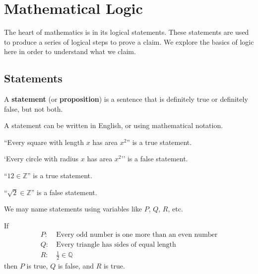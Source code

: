 \chapter{Mathematical Logic}
The heart of mathematics is in its logical statements. These statements are used to produce a series of logical steps to prove a claim. We explore the basics of logic here in order to understand what we claim.

\section{Statements}
\begin{definition}
    A \textbf{statement} (or \textbf{proposition}) is a sentence that is definitely true or definitely false, but not both.
\end{definition}
\begin{remark}
    A statement can be written in English, or using mathematical notation.
\end{remark}
\begin{example}
    ``Every square with length $x$ has area $x^2$'' is a true statement.
\end{example}
\begin{example}
    `Every circle with radius $x$ has area $x^2$'' is a false statement.
\end{example}
\begin{example}
    ``$12 \in \mathbb{Z}$'' is a true statement.
\end{example}
\begin{example}
    ``$\sqrt2 \in \mathbb{Z}$'' is a false statement.
\end{example}

We may name statements using variables like $P$, $Q$, $R$, etc.
\begin{example}
    If
    \begin{align*}
        P: &\ \text{Every odd number is one more than an even number}\\
        Q: &\ \text{Every triangle has sides of equal length}\\
        R: &\ \frac12 \in \mathbb{Q}
    \end{align*}
    then $P$ is true, $Q$ is false, and $R$ is true.
\end{example}

